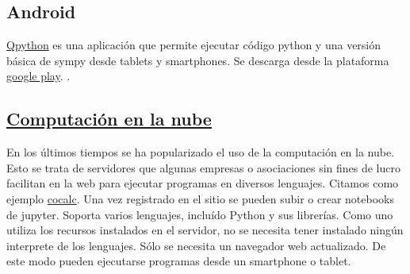 \subsection{Android} \href{http://qpython.com/}{Qpython} es una aplicación que permite ejecutar código python y una versión básica de sympy desde tablets y smartphones. Se descarga desde la plataforma \href{https://play.google.com/store/apps/details?id=com.hipipal.qpyplus}{google play}.
. 

\subsection{\href{https://es.wikipedia.org/wiki/Computación_en_la_nube}{Computación en la nube}}

En los últimos tiempos se ha popularizado el uso de la computación en la nube. Esto se trata de servidores que algunas empresas o asociaciones sin fines de lucro facilitan en la web para ejecutar programas en diversos lenguajes. Citamos como ejemplo \href{http://www.cocalc.com}{cocalc}. Una vez registrado en el sitio se pueden subir o crear notebooks de jupyter. Soporta varios lenguajes, incluído Python y sus librerías.  Como uno utiliza los recursos instalados en el servidor, no se necesita tener instalado ningún interprete de los lenguajes. Sólo se necesita un navegador web actualizado. De este modo pueden ejecutarse programas desde un smartphone o tablet. 



